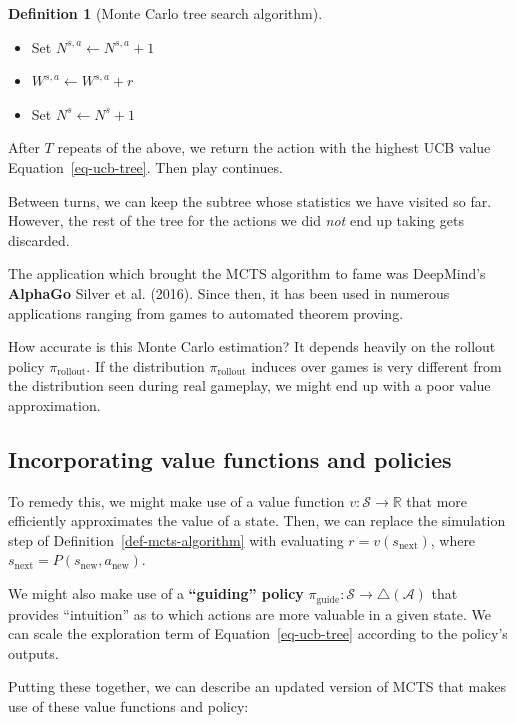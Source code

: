\documentclass[
  letterpaper,
  DIV=11,
  numbers=noendperiod]{scrreprt}
\providecommand{\tightlist}{%
  \setlength{\itemsep}{0pt}\setlength{\parskip}{0pt}}\usepackage{longtable,booktabs,array}
\theoremstyle{plain}
\theoremstyle{plain}
\theoremstyle{definition}
\theoremstyle{definition}
\newtheorem{definition}{Definition}[chapter]
\theoremstyle{remark}
\begin{document}
\begin{definition}[Monte Carlo tree search
algorithm]
\begin{enumerate}
  \begin{itemize}
  \tightlist
  \item
    Set \(N^{s, a} \gets N^{s, a} + 1\)
  \item
    \(W^{s, a} \gets W^{s, a} + r\)
  \item
    Set \(N^s \gets N^s + 1\)
  \end{itemize}
\end{enumerate}

After \(T\) repeats of the above, we return the action with the highest
UCB value Equation~\ref{eq-ucb-tree}. Then play continues.

Between turns, we can keep the subtree whose statistics we have visited
so far. However, the rest of the tree for the actions we did \emph{not}
end up taking gets discarded.

\end{definition}

The application which brought the MCTS algorithm to fame was DeepMind's
\textbf{AlphaGo} Silver et al. (2016). Since then, it has been used in
numerous applications ranging from games to automated theorem proving.

How accurate is this Monte Carlo estimation? It depends heavily on the
rollout policy \(\pi_\text{rollout}\). If the distribution
\(\pi_\text{rollout}\) induces over games is very different from the
distribution seen during real gameplay, we might end up with a poor
value approximation.

\subsection{Incorporating value functions and
policies}\label{incorporating-value-functions-and-policies}

To remedy this, we might make use of a value function
\(v : \mathcal{S} \to \mathbb{R}\) that more efficiently approximates
the value of a state. Then, we can replace the simulation step of
Definition~\ref{def-mcts-algorithm} with evaluating
\(r = v(s_\text{next})\), where
\(s_\text{next} = P(s_\text{new}, a_\text{new})\).

We might also make use of a \textbf{``guiding'' policy}
\(\pi_\text{guide} : \mathcal{S} \to \triangle(\mathcal{A})\) that
provides ``intuition'' as to which actions are more valuable in a given
state. We can scale the exploration term of Equation~\ref{eq-ucb-tree}
according to the policy's outputs.

Putting these together, we can describe an updated version of MCTS that
makes use of these value functions and policy:
\end{document}
